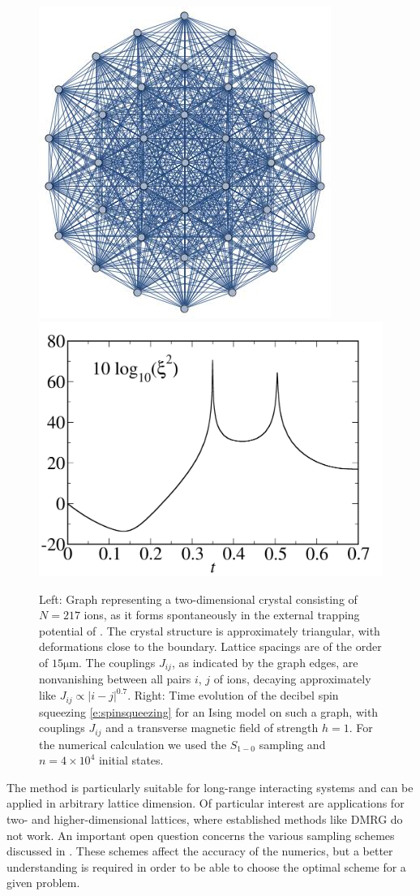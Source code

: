 \documentclass[aps,prl,showpacs,amsmath,amssymb,superscriptaddress,reprint,10pt]{revtex4-1}
\begin{document}
\begin{figure}\centering
\includegraphics[height=0.4\linewidth]{./Crystal.jpg}
\hfill
\includegraphics[height=0.4\linewidth]{./bollinger217.jpg}
\caption{\label{f:2d}%
Left: Graph representing a two-dimensional crystal consisting of $N=217$ ions, as it forms spontaneously in the external trapping potential of \cite{Britton_etal12}. The crystal structure is approximately triangular, with deformations close to the boundary. Lattice spacings are of the order of $15\mathrm{\mu m}$. The couplings $J_{ij}$, as indicated by the graph edges, are nonvanishing between all pairs $i$, $j$ of ions, decaying approximately like $J_{ij}\propto|i-j|^{0.7}$. Right: Time evolution of the decibel spin squeezing \eqref{e:spinsqueezing} for an Ising model on such a graph, with couplings $J_{ij}$ and a transverse magnetic field of strength $h=1$. For the numerical calculation we used the $S_{1-0}$ sampling and $n=4\times10^4$ initial states. 
}%
\end{figure}

The method is particularly suitable for long-range interacting systems and can be applied in arbitrary lattice dimension. Of particular interest are applications for two- and higher-dimensional lattices, where established methods like DMRG do not work. An important open question concerns the various sampling schemes discussed in \cite{Note1}. These schemes affect the accuracy of the numerics, but a better understanding is required in order to be able to choose the optimal scheme for a given problem.
\end{document}
